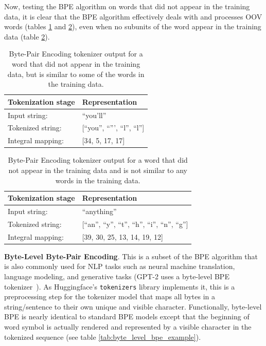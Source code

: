 \documentclass[12pt]{article}
\begin{document}
Now, testing the BPE algorithm on words that did not appear in the training data, it is clear that the BPE algorithm effectively deals with and
processes OOV words (tables \ref{tab:bpe_unk_similar} and \ref{tab:bpe_unk}), even when no subunits of the word appear in the training data (table
\ref{tab:bpe_unk}).

\begin{table}[!t]
    \centering
    \begin{tabular}{l l}
        \toprule
        Tokenization stage & Representation                 \\
        \midrule
        Input string:      & ``you'll''                     \\
        Tokenized string:  & [``you'', ``''', ``l'', ``l''] \\
        Integral mapping:  & [34, 5, 17, 17]                \\
        \bottomrule
    \end{tabular}
    \caption{Byte-Pair Encoding tokenizer output for a word that did not appear in the training data, but is similar to some of the words in the
        training data.}
    \label{tab:bpe_unk_similar}
\end{table}

\begin{table}[!t]
    \centering
    \begin{tabular}{l l}
        \toprule
        Tokenization stage & Representation                                     \\
        \midrule
        Input string:      & ``anything''                                       \\
        Tokenized string:  & [``an'', ``y'', ``t'', ``h'', ``i'', ``n'', ``g''] \\
        Integral mapping:  & [39, 30, 25, 13, 14, 19, 12]                       \\
        \bottomrule
    \end{tabular}
    \caption{Byte-Pair Encoding tokenizer output for a word that did not appear in the training data and is not similar to any words in the training
        data.}
    \label{tab:bpe_unk}
\end{table}

\textbf{Byte-Level Byte-Pair Encoding}. This is a subset of the BPE algorithm that is also commonly used for NLP tasks such as neural machine
translation, language modeling, and generative tasks (GPT-2 uses a byte-level BPE tokenizer~\cite{radford_language_2019}). As Huggingface's
\lstinline|tokenizers| library implements it, this is a preprocessing step for the tokenizer model that maps all bytes in a string/sentence to their
own unique and visible character. Functionally, byte-level BPE is nearly identical to standard BPE models except that the beginning of word symbol is
actually rendered and represented by a visible character in the tokenized sequence (see table \ref{tab:byte_level_bpe_example}).
\end{document}
